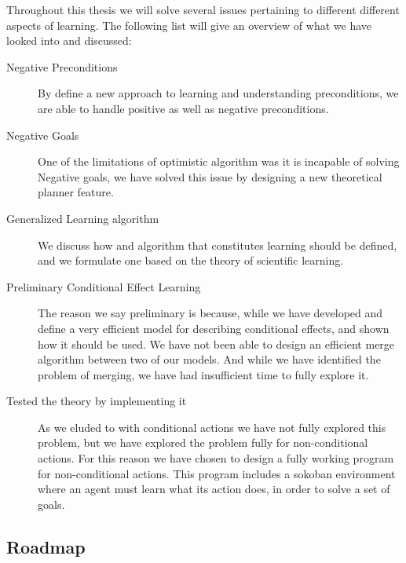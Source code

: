 \documentclass[Master.tex]{subfiles}
\begin{document}
	Throughout this thesis we will solve several issues pertaining to different different aspects of learning. The following list will give an overview of what we have looked into and discussed:
	\begin{description}
		\item[Negative Preconditions] 
		By define a new approach to learning and understanding preconditions, we are able to handle positive as well as negative preconditions.
		
		\item[Negative Goals] 
		One of the limitations of \cite{Walsh2008} optimistic algorithm was it is incapable of solving Negative goals, we have solved this issue by designing a new theoretical planner feature.
		
		\item[Generalized Learning algorithm] 
		We discuss how and algorithm that constitutes learning should be defined, and we formulate one based on the theory of scientific learning.
		
		\item[Preliminary Conditional Effect Learning]
		The reason we say preliminary is because, while we have developed and define a very efficient model for describing conditional effects, and shown how it should be used. We have not been able to design an efficient merge algorithm between two of our models. And while we have identified the problem of merging, we have had insufficient time to fully explore it.
		
		\item[Tested the theory by implementing it]
		As we eluded to with conditional actions we have not fully explored this problem, but we have explored the problem fully for non-conditional actions. For this reason we have chosen to design a fully working program for non-conditional actions. 
		This program includes a sokoban environment  where an agent must learn what its action does, in order to solve a set of goals.
		
	\end{description}
	
 \subsection*{Roadmap}
 
\end{document}
